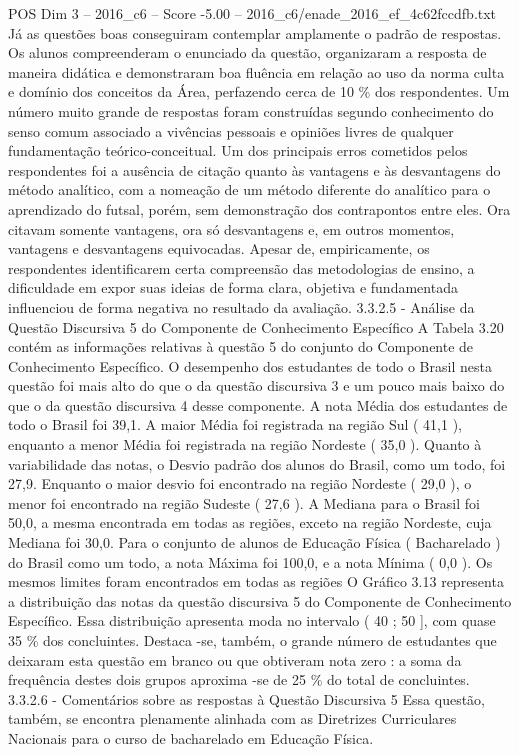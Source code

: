 \begin{textsample}{POS Dim 3 – 2016\_c6 – Score -5.00 – 2016\_c6/enade\_2016\_ef\_4c62fccdfb.txt}
Já as questões boas conseguiram contemplar amplamente o padrão de respostas.
Os alunos compreenderam o enunciado da questão, organizaram a resposta de maneira didática e demonstraram boa fluência em relação ao uso da norma culta e domínio dos conceitos da Área, perfazendo cerca de 10 \% dos respondentes.
Um número muito grande de respostas foram construídas segundo conhecimento do senso comum associado a vivências pessoais e opiniões livres de qualquer fundamentação teórico-conceitual.
Um dos principais erros cometidos pelos respondentes foi a ausência de citação quanto às vantagens e às desvantagens do método analítico, com a nomeação de um método diferente do analítico para o aprendizado do futsal, porém, sem demonstração dos contrapontos entre eles.
Ora citavam somente vantagens, ora só desvantagens e, em outros momentos, vantagens e desvantagens equivocadas.
Apesar de, empiricamente, os respondentes identificarem certa compreensão das metodologias de ensino, a dificuldade em expor suas ideias de forma clara, objetiva e fundamentada influenciou de forma negativa no resultado da avaliação. 3.3.2.5 - Análise da Questão Discursiva 5 do Componente de Conhecimento Específico A Tabela 3.20 contém as informações relativas à questão 5 do conjunto do Componente de Conhecimento Específico.
O desempenho dos estudantes de todo o Brasil nesta questão foi mais alto do que o da questão discursiva 3 e um pouco mais baixo do que o da questão discursiva 4 desse componente.
A nota Média dos estudantes de todo o Brasil foi 39,1.
A maior Média foi registrada na região Sul ( 41,1 ), enquanto a menor Média foi registrada na região Nordeste ( 35,0 ).
Quanto à variabilidade das notas, o Desvio padrão dos alunos do Brasil, como um todo, foi 27,9.
Enquanto o maior desvio foi encontrado na região Nordeste ( 29,0 ), o menor foi encontrado na região Sudeste ( 27,6 ).
A Mediana para o Brasil foi 50,0, a mesma encontrada em todas as regiões, exceto na região Nordeste, cuja Mediana foi 30,0.
Para o conjunto de alunos de Educação Física ( Bacharelado ) do Brasil como um todo, a nota Máxima foi 100,0, e a nota Mínima ( 0,0 ).
Os mesmos limites foram encontrados em todas as regiões O Gráfico 3.13 representa a distribuição das notas da questão discursiva 5 do Componente de Conhecimento Específico.
Essa distribuição apresenta moda no intervalo ( 40 ; 50 ], com quase 35 \% dos concluintes.
Destaca -se, também, o grande número de estudantes que deixaram esta questão em branco ou que obtiveram nota zero : a soma da frequência destes dois grupos aproxima -se de 25 \% do total de concluintes. 3.3.2.6 - Comentários sobre as respostas à Questão Discursiva 5 Essa questão, também, se encontra plenamente alinhada com as Diretrizes Curriculares Nacionais para o curso de bacharelado em Educação Física.

\end{textsample}
